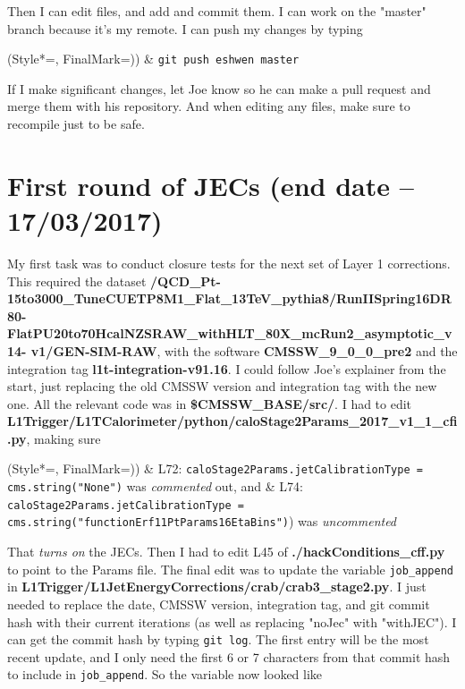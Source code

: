 Then I can edit files, and add and commit them. I can work on the "master" branch because it's my remote. I can push my changes by typing

\begin{easylist}
\ListProperties(Style*=, FinalMark={)})
& \texttt{git push eshwen master}
\end{easylist}

If I make significant changes, let Joe know so he can make a pull request and merge them with his repository. And when editing any files, make sure to recompile just to be safe.

\section{First round of JECs (end date -- 17/03/2017)}

My first task was to conduct closure tests for the next set of Layer 1 corrections. This required the dataset \textbf{/QCD\_Pt-15to3000\_TuneCUETP8M1\_Flat\_13TeV\_pythia8/RunIISpring16DR80-FlatPU20to70HcalNZSRAW\_withHLT\_80X\_mcRun2\_asymptotic\_v14- v1/GEN-SIM-RAW}, with the software \textbf{CMSSW\_9\_0\_0\_pre2} and the integration tag \textbf{l1t-integration-v91.16}. I could follow Joe's explainer from the start, just replacing the old CMSSW version and integration tag with the new one. All the relevant code was in \textbf{\$CMSSW\_BASE/src/}. I had to edit \textbf{L1Trigger/L1TCalorimeter/python/caloStage2Params\_2017\_v1\_1\_cfi.py}, making sure

\begin{easylist}
\ListProperties(Style*=, FinalMark={)})
& L72: \texttt{caloStage2Params.jetCalibrationType = cms.string("None")} was \emph{commented} out, and
& L74: \texttt{caloStage2Params.jetCalibrationType = cms.string("functionErf11PtParams16EtaBins")}) was \emph{uncommented}
\end{easylist}

That \emph{turns on} the JECs. Then I had to edit L45 of \textbf{./hackConditions\_cff.py} to point to the Params file. The final edit was to update the variable \texttt{job\_append} in \textbf{L1Trigger/L1JetEnergyCorrections/crab/crab3\_stage2.py}. I just needed to replace the date, CMSSW version, integration tag, and git commit hash with their current iterations (as well as replacing "noJec" with "withJEC"). I can get the commit hash by typing \texttt{git log}. The first entry will be the most recent update, and I only need the first 6 or 7 characters from that commit hash to include in \texttt{job\_append}. So the variable now looked like

